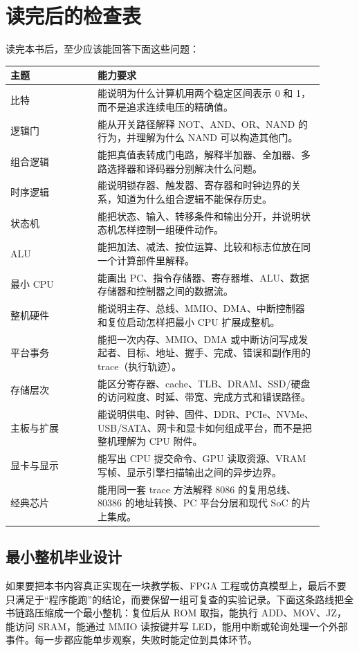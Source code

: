 \chapter*{读完后的检查表}

读完本书后，至少应该能回答下面这些问题：

\begin{longtable}{p{0.25\linewidth}p{0.65\linewidth}}
\toprule
主题 & 能力要求 \\
\midrule
比特 & 能说明为什么计算机用两个稳定区间表示 0 和 1，而不是追求连续电压的精确值。 \\
逻辑门 & 能从开关路径解释 NOT、AND、OR、NAND 的行为，并理解为什么 NAND 可以构造其他门。 \\
组合逻辑 & 能把真值表转成门电路，解释半加器、全加器、多路选择器和译码器分别解决什么问题。 \\
时序逻辑 & 能说明锁存器、触发器、寄存器和时钟边界的关系，知道为什么组合逻辑不能保存历史。 \\
状态机 & 能把状态、输入、转移条件和输出分开，并说明状态机怎样控制一组硬件动作。 \\
ALU & 能把加法、减法、按位运算、比较和标志位放在同一个计算部件里解释。 \\
最小 CPU & 能画出 PC、指令存储器、寄存器堆、ALU、数据存储器和控制器之间的数据流。 \\
整机硬件 & 能说明主存、总线、MMIO、DMA、中断控制器和复位启动怎样把最小 CPU 扩展成整机。 \\
平台事务 & 能把一次内存、MMIO、DMA 或中断访问写成发起者、目标、地址、握手、完成、错误和副作用的 trace（执行轨迹）。 \\
存储层次 & 能区分寄存器、cache、TLB、DRAM、SSD/硬盘的访问粒度、时延、带宽、完成方式和错误路径。 \\
主板与扩展 & 能说明供电、时钟、固件、DDR、PCIe、NVMe、USB/SATA、网卡和显卡如何组成平台，而不是把整机理解为 CPU 附件。 \\
显卡与显示 & 能写出 CPU 提交命令、GPU 读取资源、VRAM 写帧、显示引擎扫描输出之间的异步边界。 \\
经典芯片 & 能用同一套 trace 方法解释 8086 的复用总线、80386 的地址转换、PC 平台分层和现代 SoC 的片上集成。 \\
\bottomrule
\end{longtable}

\section*{最小整机毕业设计}

如果要把本书内容真正实现在一块教学板、FPGA 工程或仿真模型上，最后不要只满足于“程序能跑”的结论，而要保留一组可复查的实验记录。下面这条路线把全书链路压缩成一个最小整机：复位后从 ROM 取指，能执行 ADD、MOV、JZ，能访问 SRAM，能通过 MMIO 读按键并写 LED，能用中断或轮询处理一个外部事件。每一步都应能单步观察，失败时能定位到具体环节。


